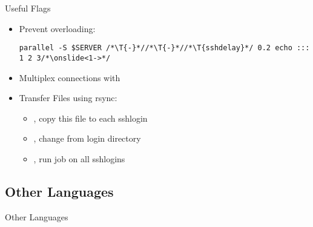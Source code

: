 {
\begin{frame}[fragile]{Useful Flags}
\begin{itemize}[<+(1)->]
   \itemsep3pt
   \item Prevent  overloading:\pause
\begin{verbatim}
parallel -S $SERVER /*\T{-}*//*\T{-}*//*\T{sshdelay}*/ 0.2 echo ::: 1 2 3/*\onslide<1->*/
\end{verbatim}
   \item Multiplex connections with 
   \item Transfer Files using rsync: \begin{itemize}
      \item {}, copy this file to each sshlogin %
      \item {}, change from login directory
      \item {}, run job on all sshlogins %
   \end{itemize}
\end{itemize}
\end{frame}
\SidebarReset

\subsection{Other Languages}
\begin{frame}[fragile]{Other Languages}
\begin{layout-imageonly}%
\end{layout-imageonly}
\end{frame}}
